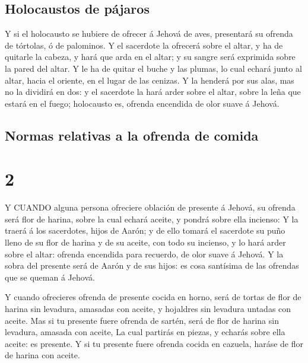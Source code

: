 \hypertarget{holocaustos-de-puxe1jaros}{%
\subsection{Holocaustos de pájaros}\label{holocaustos-de-puxe1jaros}}

 Y si el holocausto se hubiere de ofrecer á Jehová de aves,
presentará su ofrenda de tórtolas, ó de palominos.  Y el
sacerdote la ofrecerá sobre el altar, y ha de quitarle la cabeza, y hará
que arda en el altar; y su sangre será exprimida sobre la pared del
altar.  Y le ha de quitar el buche y las plumas, lo cual
echará junto al altar, hacia el oriente, en el lugar de las cenizas.
 Y la henderá por sus alas, mas no la dividirá en dos: y el
sacerdote la hará arder sobre el altar, sobre la leña que estará en el
fuego; holocausto es, ofrenda encendida de olor suave á Jehová.

\hypertarget{normas-relativas-a-la-ofrenda-de-comida}{%
\subsection{Normas relativas a la ofrenda de
comida}\label{normas-relativas-a-la-ofrenda-de-comida}}

\hypertarget{section-1}{%
\section{2}\label{section-1}}

 Y CUANDO alguna persona ofreciere oblación de presente á
Jehová, su ofrenda será flor de harina, sobre la cual echará aceite, y
pondrá sobre ella incienso:  Y la traerá á los sacerdotes,
hijos de Aarón; y de ello tomará el sacerdote su puño lleno de su flor
de harina y de su aceite, con todo su incienso, y lo hará arder sobre el
altar: ofrenda encendida para recuerdo, de olor suave á Jehová.
 Y la sobra del presente será de Aarón y de sus hijos: es
cosa santísima de las ofrendas que se queman á Jehová.

 Y cuando ofrecieres ofrenda de presente cocida en horno,
será de tortas de flor de harina sin levadura, amasadas con aceite, y
hojaldres sin levadura untadas con aceite.  Mas si tu
presente fuere ofrenda de sartén, será de flor de harina sin levadura,
amasada con aceite,  La cual partirás en piezas, y echarás
sobre ella aceite: es presente.  Y si tu presente fuere
ofrenda cocida en cazuela, haráse de flor de harina con aceite.

